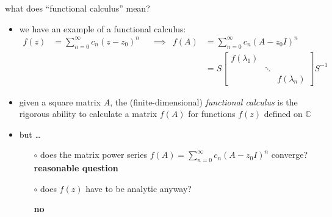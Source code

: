 \documentclass[10pt,hyperref]{beamer}
\newcommand{\CC}{\mathbb{C}}
\begin{document}
\begin{frame}{what does ``functional calculus'' mean?}

\begin{itemize}
\item we have an example of a functional calculus:
\small
\begin{align*}
f(z) &= \sum_{n=0}^\infty c_n (z-z_0)^n & &\implies & f(A) &= \sum_{n=0}^\infty c_n (A-z_0 I)^n \\
     &&&& &= S \begin{bmatrix} f(\lambda_1) & & \\ & \ddots & \\ & & f(\lambda_n) \end{bmatrix} S^{-1}
\end{align*}
\normalsize
\item given a square matrix $A$, the (finite-dimensional) \emph{functional calculus} is the rigorous ability to calculate a matrix $f(A)$ for functions $f(z)$ defined on $\CC$
\item but \dots
    \begin{itemize}
    \item[$\circ$] does the matrix power series $f(A) = \sum_{n=0}^\infty c_n (A-z_0 I)^n$ converge? \textbf{reasonable question}
    \item[$\circ$] does $f(z)$ have to be analytic anyway?
    
     \textbf{no}
    \end{itemize}
\end{itemize}
\end{frame}
\end{document}
